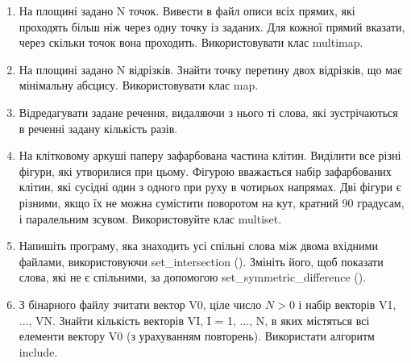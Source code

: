 \documentclass[a5paper,titlepage,openany,twoside,
]
{book_unv}%
\begin{document}
\begin{enumerate}
\def\labelenumi{\arabic{enumi})}
\setcounter{enumi}{4}
\item
  На площині задано N точок. Вивести в файл описи всіх прямих, які
  проходять більш ніж через одну точку із заданих. Для кожної прямий
  вказати, через скільки точок вона проходить. Використовувати клас
  multimap.
\item
  На площині задано N відрізків. Знайти точку перетину двох відрізків,
  що має мінімальну абсцису. Використовувати клас map.
\item
  Відредагувати задане речення, видаляючи з нього ті слова, які
  зустрічаються в реченні задану кількість разів.
\item
  На клітковому аркуші паперу зафарбована частина клітин. Виділити все
  різні фігури, які утворилися при цьому. Фігурою вважається набір
  зафарбованих клітин, які сусідні один з одного при руху в чотирьох
  напрямах. Дві фігури є різними, якщо їх не можна сумістити поворотом
  на кут, кратний 90 градусам, і паралельним зсувом. Використовуйте
  клас multiset.


\item
  Напишіть програму, яка знаходить усі спільні слова між двома вхідними
  файлами, використовуючи set\_intersection (). Змініть його, щоб
  показати слова, які не є спільними, за допомогою
  set\_symmetric\_difference ().

\item
З бінарного файлу зчитати вектор V0, ціле число $N > 0$ і набір векторів
V1, ..., VN.  Знайти кількість векторів VI,
I = 1, ..., N, в яких містяться всі елементи вектору V0 (з урахуванням повторень). 
Використати алгоритм include.


\end{enumerate}
\end{document}
